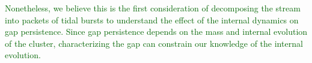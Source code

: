 \documentclass{aa}
\newcommand{\paola}[1]{\textcolor{magenta}{{#1}}}
\newcommand{\salvatore}[1]{\textcolor{darkgreen}{{#1}}}
\begin{document}
\begin{appendix}
\salvatore{Nonetheless, we believe this is the first consideration of decomposing the stream into packets of tidal bursts to understand the effect of the internal dynamics on gap persistence. Since gap persistence depends on the mass and internal evolution of the cluster, characterizing the gap can constrain our knowledge of the internal evolution. }



\end{appendix}
\end{document}
